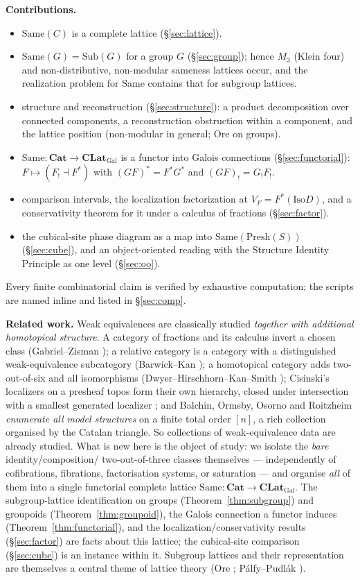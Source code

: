 \documentclass[11pt]{amsart}
\theoremstyle{definition}
\newcommand{\Same}{\mathrm{Same}}
\newcommand{\Sub}{\mathrm{Sub}}
\newcommand{\Iso}{\mathrm{Iso}}
\newcommand{\Fstar}{F^{*}}
\newcommand{\Fshriek}{F_{!}}
\newcommand{\Presh}{\mathrm{Presh}}
\newcommand{\Cat}{\mathbf{Cat}}
\newcommand{\CLatGal}{\mathbf{CLat}_{\mathrm{Gal}}}
\begin{document}
\medskip\noindent\textbf{Contributions.}
\begin{itemize}
\item $\Same(C)$ is a complete lattice (\S\ref{sec:lattice}).
\item $\Same(G)=\Sub(G)$ for a group $G$ (\S\ref{sec:group}); hence $M_3$ (Klein
four) and non-distributive, non-modular sameness lattices occur, and the
realization problem for $\Same$ contains that for subgroup lattices.
\item structure and reconstruction (\S\ref{sec:structure}): a product
decomposition over connected components, a reconstruction obstruction within a
component, and the lattice position (non-modular in general; Ore on groups).
\item $\Same\colon\Cat\to\CLatGal$ is a functor into Galois connections
(\S\ref{sec:functorial}): $F\mapsto(\Fshriek\dashv\Fstar)$ with
$(GF)^{*}=F^{*}G^{*}$ and $(GF)_{!}=G_{!}F_{!}$.
\item comparison intervals, the localization factorization at $V_F=\Fstar(\Iso
D)$, and a conservativity theorem for it under a calculus of fractions
(\S\ref{sec:factor}).
\item the cubical-site phase diagram as a map into $\Same(\Presh(S))$
(\S\ref{sec:cube}), and an object-oriented reading with the Structure Identity
Principle as one level (\S\ref{sec:oo}).
\end{itemize}

Every finite combinatorial claim is verified by exhaustive computation; the
scripts are named inline and listed in \S\ref{sec:comp}.

\medskip\noindent\textbf{Related work.} Weak equivalences are classically studied
\emph{together with additional homotopical structure}. A category of fractions
and its calculus invert a chosen class (Gabriel--Zisman \cite{GZ}); a relative
category is a category with a distinguished weak-equivalence subcategory
(Barwick--Kan \cite{BarwickKan}); a homotopical category adds two-out-of-six and
all isomorphisms (Dwyer--Hirschhorn--Kan--Smith \cite{DHKS}); Cisinski's
localizers on a presheaf topos form their own hierarchy, closed under
intersection with a smallest generated localizer \cite{Cisinski}; and Balchin,
Ormsby, Osorno and Roitzheim \cite{Balchin} \emph{enumerate all model structures}
on a finite total order $[n]$, a rich collection organised by the Catalan
triangle. So collections of weak-equivalence data are already studied. What is
new here is the object of study: we isolate the \emph{bare} identity/composition/
two-out-of-three classes themselves --- independently of cofibrations,
fibrations, factorisation systems, or saturation --- and organise \emph{all} of
them into a single functorial complete lattice
$\Same\colon\Cat\to\CLatGal$. The subgroup-lattice identification on groups
(Theorem~\ref{thm:subgroup}) and groupoids (Theorem~\ref{thm:groupoid}), the
Galois connection a functor induces (Theorem~\ref{thm:functorial}), and the
localization/conservativity results (\S\ref{sec:factor}) are facts about this
lattice; the cubical-site comparison (\S\ref{sec:cube}) is an instance within it.
Subgroup lattices and their representation are themselves a central theme of
lattice theory (Ore \cite{Ore}; P\'alfy--Pudl\'ak \cite{PalfyPudlak}).
\end{document}
